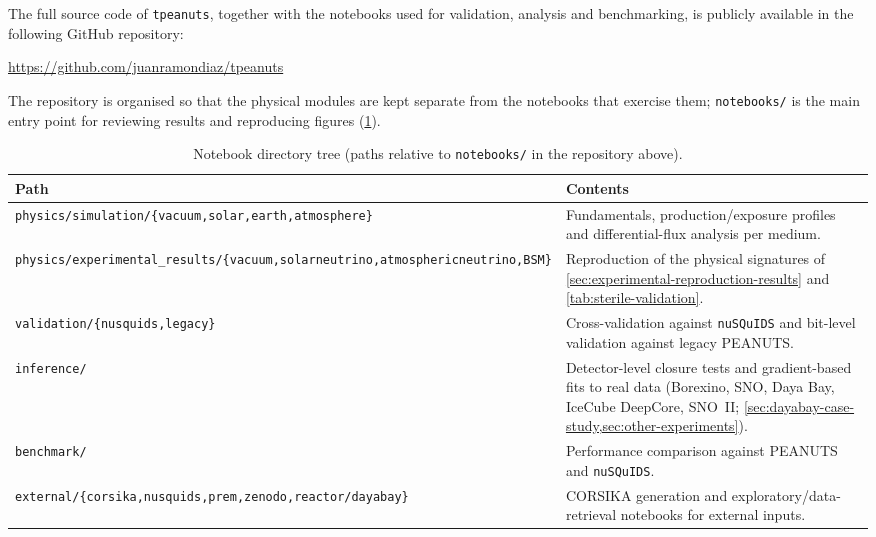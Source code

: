 The full source code of \texttt{tpeanuts}, together with the notebooks used for validation, analysis and benchmarking, is publicly available in the following GitHub repository:

\begin{center}
  \url{https://github.com/juanramondiaz/tpeanuts}
\end{center}

The repository is organised so that the physical modules are kept separate from the notebooks that exercise them; \texttt{notebooks/} is the main entry point for reviewing results and reproducing figures (\cref{tab:notebook-tree}).

\begin{table}[htbp]
  \centering
  \footnotesize
  \caption{Notebook directory tree (paths relative to \texttt{notebooks/} in the repository above).}
  \label{tab:notebook-tree}
  \begin{tabularx}{\textwidth}{XX}
    \toprule
    Path & Contents \\
    \midrule
    \texttt{physics/\allowbreak simulation/\allowbreak\{vacuum,\allowbreak solar,\allowbreak earth,\allowbreak atmosphere\}} & Fundamentals, production/exposure profiles and differential-flux analysis per medium. \\
    \texttt{physics/\allowbreak experimental\_results/\allowbreak\{vacuum,\allowbreak solarneutrino,\allowbreak atmosphericneutrino,\allowbreak BSM\}} & Reproduction of the physical signatures of \cref{sec:experimental-reproduction-results} and \cref{tab:sterile-validation}. \\
    \texttt{validation/\allowbreak\{nusquids,\allowbreak legacy\}} & Cross-validation against \texttt{nuSQuIDS} and bit-level validation against legacy PEANUTS. \\
    \texttt{inference/} & Detector-level closure tests and gradient-based fits to real data (Borexino, SNO, Daya Bay, IceCube DeepCore, SNO~II; \cref{sec:dayabay-case-study,sec:other-experiments}). \\
    \texttt{benchmark/} & Performance comparison against PEANUTS and \texttt{nuSQuIDS}. \\
    \texttt{external/\allowbreak\{corsika,\allowbreak nusquids,\allowbreak prem,\allowbreak zenodo,\allowbreak reactor/\allowbreak dayabay\}} & CORSIKA generation and exploratory/data-retrieval notebooks for external inputs. \\
    \bottomrule
  \end{tabularx}
\end{table}


